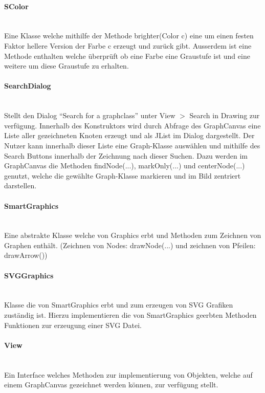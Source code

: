 \documentclass[10pt,a4paper]{article}
\begin{document}
\paragraph{SColor}\ \\Eine Klasse welche mithilfe der Methode brighter(Color c) eine um einen festen Faktor hellere Version der Farbe c erzeugt und zurück gibt. Ausserdem ist eine Methode enthalten welche überprüft ob eine Farbe eine Graustufe ist und eine weitere um diese Graustufe zu erhalten.

\paragraph{SearchDialog}\ \\Stellt den Dialog "`Search for a graphclass"' unter View $>$ Search in Drawing zur verfügung. Innerhalb des Konstruktors wird durch Abfrage des GraphCanvas eine Liste aller gezeichneten Knoten erzeugt und als JList im Dialog dargestellt. Der Nutzer kann innerhalb dieser Liste eine Graph-Klasse auswählen und mithilfe des Search Buttons innerhalb der Zeichnung nach dieser Suchen. Dazu werden im GraphCanvas die Methoden findNode(...), markOnly(...) und centerNode(...) genutzt, welche die gewählte Graph-Klasse markieren und im Bild zentriert darstellen. 

\paragraph{SmartGraphics}\ \\Eine abstrakte Klasse welche von Graphics erbt und Methoden zum Zeichnen von Graphen enthält. (Zeichnen von Nodes: drawNode(...) und zeichnen von Pfeilen: drawArrow())

\paragraph{SVGGraphics}\ \\Klasse die von SmartGraphics erbt und zum erzeugen von SVG Grafiken zuständig ist. Hierzu implementieren die von SmartGraphics geerbten Methoden Funktionen zur erzeugung einer SVG Datei.

\paragraph{View}\ \\Ein Interface welches Methoden zur implementierung von Objekten, welche auf einem GraphCanvas gezeichnet werden können, zur verfügung stellt.
\end{document}
